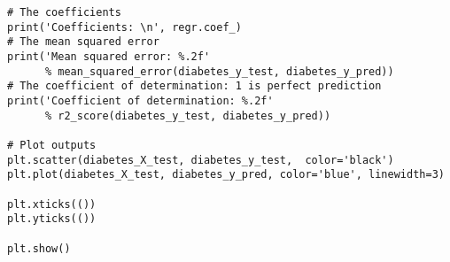 {\begin{lstlisting}
# The coefficients
print('Coefficients: \n', regr.coef_)
# The mean squared error
print('Mean squared error: %.2f'
      % mean_squared_error(diabetes_y_test, diabetes_y_pred))
# The coefficient of determination: 1 is perfect prediction
print('Coefficient of determination: %.2f'
      % r2_score(diabetes_y_test, diabetes_y_pred))

# Plot outputs
plt.scatter(diabetes_X_test, diabetes_y_test,  color='black')
plt.plot(diabetes_X_test, diabetes_y_pred, color='blue', linewidth=3)

plt.xticks(())
plt.yticks(())

plt.show()
\end{lstlisting}

%
%
%
%
%
%
%
%
%
%
}
